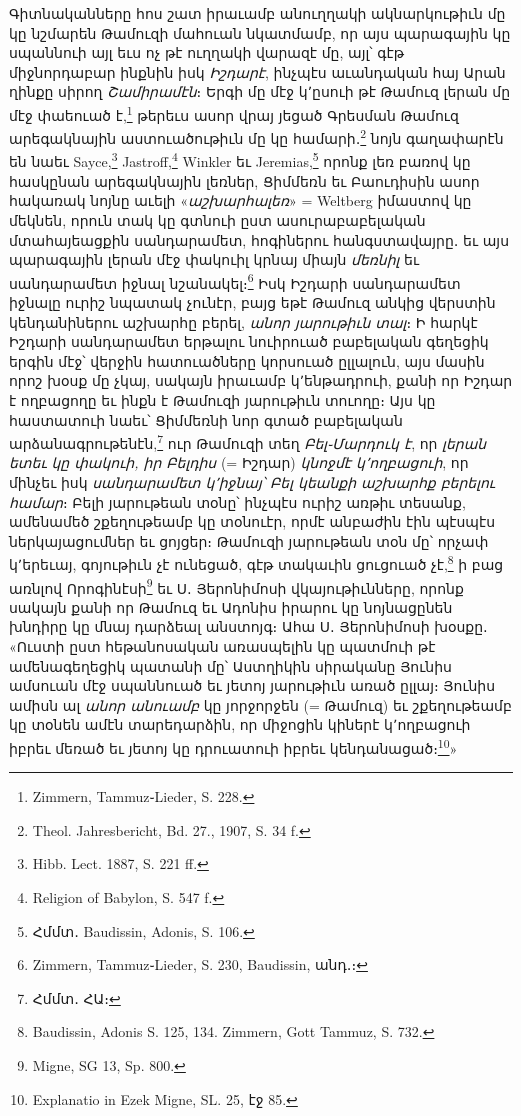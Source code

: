 \documentclass{article}
\begin{document}
{Գիտնականները հոս շատ իրաւամբ անուղղակի ակնարկութիւն մը կը նշմարեն Թամուզի մահուան նկատմամբ, որ այս պարագային կը սպաննուի այլ եւս ոչ թէ ուղղակի վարազէ մը, այլ՝ գէթ միջնորդաբար ինքնին իսկ \emph{Իշդարէ}, ինչպէս աւանդական հայ Արան ղինքը սիրող \emph{Շամիրամէն}։ Երգի մը մէջ կ՚ըսուի թէ Թամուզ լերան մը մէջ փաեուած է,\footnote{Zimmern, Tammuz֊Lieder, S. 228.} թերեւս ասոր վրայ յեցած Գրեսման Թամուզ արեգակնային աստուածութիւն մը կը համարի․\footnote{Theol. Jahresbericht, Bd. 27., 1907, S. 34 f.} նոյն գաղափարէն են նաեւ Sayce,\footnote{Hibb. Lect. 1887, S. 221 ff.} Jastroff,\footnote{Religion of Babylon, S. 547 f.} Winkler եւ Jeremias,\footnote{Հմմտ․ Baudissin, Adonis, S. 106.} որոնք լեռ բառով կը հասկընան արեգակնային լեռներ, Ցիմմեռն եւ Բաուդիսին ասոր հակառակ նոյնը աւելի «\emph{աշխարհալեռ}» = Weltberg իմաստով կը մեկնեն, որուն տակ կը գտնուի ըստ ասուրաբաբելական մտահայեացքին սանդարամետ, հոգիներու հանգստավայրը․ եւ այս պարագային լերան մէջ փակուիլ կրնայ միայն \emph{մեռնիլ} եւ սանդարամետ իջնալ նշանակել։\footnote{Zimmern, Tammuz֊Lieder, S. 230, Baudissin, անդ․։} Իսկ Իշդարի սանդարամետ իջնալը ուրիշ նպատակ չունէր, բայց եթէ Թամուզ անկից վերստին կենդանիներու աշխարհը բերել, \emph{անոր յարութիւն տալ}։ Ի հարկէ Իշդարի սանդարամետ երթալու նուիրուած բաբելական գեղեցիկ երգին մէջ՝ վերջին հատուածները կորսուած ըլլալուն, այս մասին որոշ խօսք մը չկայ, սակայն իրաւամբ կ՚ենթադրուի, քանի որ Իշդար է ողբացողը եւ ինքն է Թամուզի յարութիւն տուողը։ Այս կը հաստատուի նաեւ՝ Ցիմմեռնի նոր գտած բաբելական արձանագրութենէն,\footnote{Հմմտ․ ՀԱ։} ուր Թամուզի տեղ \emph{Բել֊Մարդուկ է}, որ \emph{լերան ետեւ կը փակուի, իր Բելդիս} (= Իշդար) \emph{կնոջմէ կ՚ողբացուի}, որ մինչեւ իսկ \emph{սանդարամետ կ՚իջնայ՝ Բել կեանքի աշխարհք բերելու համար}։ Բելի յարութեան տօնը՝ ինչպէս ուրիշ առթիւ տեսանք, ամենամեծ շքեղութեամբ կը տօնուէր, որմէ անբաժին էին պէսպէս ներկայացումներ եւ ցոյցեր։ Թամուզի յարութեան տօն մը՝ որչափ կ՚երեւայ, գոյութիւն չէ ունեցած, գէթ տակաւին ցուցուած չէ,\footnote{Baudissin, Adonis S. 125, 134. Zimmern, Gott Tammuz, S. 732.} ի բաց առնլով Որոգինէսի\footnote{Migne, SG 13, Sp. 800.} եւ Ս․ Յերոնիմոսի վկայութիւնները, որոնք սակայն քանի որ Թամուզ եւ Ադոնիս իրարու կը նոյնացընեն խնդիրը կը մնայ դարձեալ անստոյգ։ Ահա Ս․ Յերոնիմոսի խօսքը․ «Ուստի ըստ հեթանոսական առասպելին կը պատմուի թէ ամենագեղեցիկ պատանի մը՝ Աստղիկին սիրականը Յունիս ամսուան մէջ սպաննուած եւ յետոյ յարութիւն առած ըլլայ։ Յունիս ամիսն ալ \emph{անոր անուամբ} կը յորջորջեն (= Թամուզ) եւ շքեղութեամբ կը տօնեն ամէն տարեդարձին, որ միջոցին կիներէ կ՚ողբացուի իբրեւ մեռած եւ յետոյ կը դրուատուի իբրեւ կենդանացած։\footnote{Explanatio in Ezek Migne, SL. 25, էջ 85.}»

}
\end{document}
